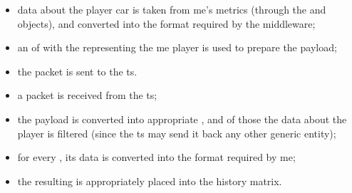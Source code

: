 \begin{itemize}
	\item data about the player car is taken from \gls{me}'s metrics (through the  and  objects), and converted into the format required by the \gls{middleware};
	\item an  of  with the  representing the \gls{me} player is used to prepare the payload;
	\item the packet is sent to the \gls{ts}.
	\item a packet is received from the \gls{ts};
	\item the payload is converted into appropriate , and of those the data about the player is filtered (since the \gls{ts} may send it back any other generic entity);
	\item for every , its data is converted into the format required by \gls{me};
	\item the resulting  is appropriately placed into the history matrix.
\end{itemize}

